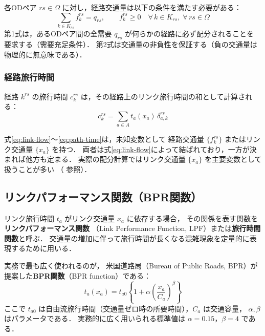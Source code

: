 各ODペア $rs \in \Omega$ に対し，経路交通量は以下の条件を満たす必要がある：
\begin{equation}
  \sum_{k \in K_{rs}} f_k^{rs} = q_{rs}, \qquad
  f_k^{rs} \geq 0 \quad \forall\, k \in K_{rs},\; \forall\, rs \in \Omega
  \label{eq:flow-conservation}
\end{equation}
第1式は，あるODペア間の全需要 $q_{rs}$ が何らかの経路に必ず配分されることを
要求する（需要充足条件）．
第2式は交通量の非負性を保証する（負の交通量は物理的に無意味である）．

\subsubsection*{経路旅行時間}

経路 $k^{rs}$ の旅行時間 $c_k^{rs}$ は，その経路上のリンク旅行時間の和として計算される：
\begin{equation}
  c_k^{rs} = \sum_{a \in A} t_a(x_a)\, \delta_{a,k}^{rs}
  \label{eq:path-time}
\end{equation}

式\eqref{eq:link-flow}〜\eqref{eq:path-time}は，未知変数として
経路交通量 $\{f_k^{rs}\}$ またはリンク交通量 $\{x_a\}$ を持つ．
両者は式\eqref{eq:link-flow}によって結ばれており，一方が決まれば他方も定まる．
実際の配分計算ではリンク交通量 $\{x_a\}$ を主要変数として扱うことが多い
（ 参照）\cite{Beckmann1956}．

\subsection{リンクパフォーマンス関数（BPR関数）}
\label{subsec:bpr}

リンク旅行時間 $t_a$ がリンク交通量 $x_a$ に依存する場合，
その関係を表す関数を\textbf{リンクパフォーマンス関数}
（Link Performance Function, LPF）または\textbf{旅行時間関数}と呼ぶ．
交通量の増加に伴って旅行時間が長くなる混雑現象を定量的に表現するために用いる．

実務で最も広く使われるのが，
米国道路局（Bureau of Public Roads, BPR）が提案した\textbf{BPR関数}（BPR function）である\cite{土木学会1998}：
\begin{equation}
  t_a(x_a) = t_{a0}\left\{1 + \alpha\left(\frac{x_a}{C_a}\right)^{\beta}\right\}
  \label{eq:bpr}
\end{equation}
ここで $t_{a0}$ は自由流旅行時間（交通量ゼロ時の所要時間），$C_a$ は交通容量，
$\alpha, \beta$ はパラメータである．
実務的に広く用いられる標準値は $\alpha = 0.15$，$\beta = 4$ である．

